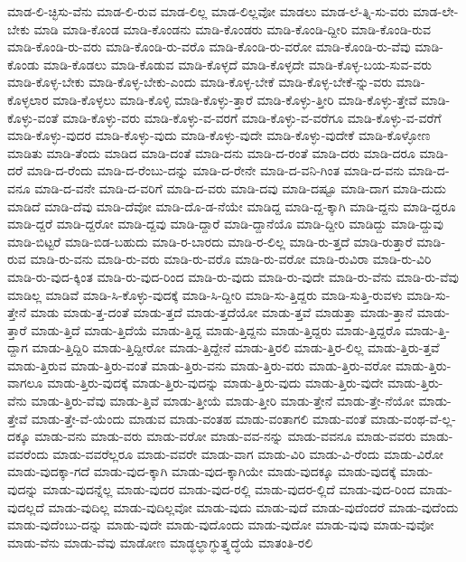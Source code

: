 {ಮಾಡ-ಲಿ-ಚ್ಛಿಸು-ವೆನು
ಮಾಡ-ಲಿ-ರುವ
ಮಾಡ-ಲಿಲ್ಲ
ಮಾಡ-ಲಿಲ್ಲವೋ
ಮಾಡಲು
ಮಾಡ-ಲೆ-ತ್ನಿ-ಸು-ವರು
ಮಾಡ-ಲೇ-ಬೇಕು
ಮಾಡಿ
ಮಾಡಿ-ಕೊಂಡ
ಮಾಡಿ-ಕೊಂಡನು
ಮಾಡಿ-ಕೊಂಡರು
ಮಾಡಿ-ಕೊಂಡಿ-ದ್ದೀರಿ
ಮಾಡಿ-ಕೊಂಡಿ-ರುವ
ಮಾಡಿ-ಕೊಂಡಿ-ರು-ವರು
ಮಾಡಿ-ಕೊಂಡಿ-ರು-ವರೊ
ಮಾಡಿ-ಕೊಂಡಿ-ರು-ವರೋ
ಮಾಡಿ-ಕೊಂಡಿ-ರು-ವೆವು
ಮಾಡಿ-ಕೊಂಡು
ಮಾಡಿ-ಕೊಡಲು
ಮಾಡಿ-ಕೊಡುವ
ಮಾಡಿ-ಕೊಳ್ಳದೆ
ಮಾಡಿ-ಕೊಳ್ಳದೇ
ಮಾಡಿ-ಕೊಳ್ಳ-ಬಯ-ಸುವ-ವರು
ಮಾಡಿ-ಕೊಳ್ಳ-ಬೇಕು
ಮಾಡಿ-ಕೊಳ್ಳ-ಬೇಕು-ಎಂದು
ಮಾಡಿ-ಕೊಳ್ಳ-ಬೇಕೆ
ಮಾಡಿ-ಕೊಳ್ಳ-ಬೇಕೆ-ನ್ನು-ವರು
ಮಾಡಿ-ಕೊಳ್ಳಲಾರ
ಮಾಡಿ-ಕೊಳ್ಳಲು
ಮಾಡಿ-ಕೊಳ್ಳಿ
ಮಾಡಿ-ಕೊಳ್ಳು-ತ್ತಾರೆ
ಮಾಡಿ-ಕೊಳ್ಳು-ತ್ತೀರಿ
ಮಾಡಿ-ಕೊಳ್ಳು-ತ್ತೇವೆ
ಮಾಡಿ-ಕೊಳ್ಳು-ವಂತೆ
ಮಾಡಿ-ಕೊಳ್ಳು-ವರು
ಮಾಡಿ-ಕೊಳ್ಳು-ವ-ವರಗೆ
ಮಾಡಿ-ಕೊಳ್ಳು-ವ-ವರೆಗೂ
ಮಾಡಿ-ಕೊಳ್ಳು-ವ-ವರೆಗೆ
ಮಾಡಿ-ಕೊಳ್ಳು-ವುದರ
ಮಾಡಿ-ಕೊಳ್ಳು-ವುದು
ಮಾಡಿ-ಕೊಳ್ಳು-ವುದೇ
ಮಾಡಿ-ಕೊಳ್ಳು-ವುದೇಕೆ
ಮಾಡಿ-ಕೊಳ್ಳೋಣ
ಮಾಡಿತು
ಮಾಡಿ-ತೆಂದು
ಮಾಡಿದ
ಮಾಡಿ-ದಂತೆ
ಮಾಡಿ-ದನು
ಮಾಡಿ-ದ-ರಂತೆ
ಮಾಡಿ-ದರು
ಮಾಡಿ-ದರೂ
ಮಾಡಿ-ದರೆ
ಮಾಡಿ-ದ-ರೆಂದು
ಮಾಡಿ-ದ-ರೆಂಬು-ದನ್ನು
ಮಾಡಿ-ದ-ರೇನೇ
ಮಾಡಿ-ದ-ವನಿ-ಗಿಂತ
ಮಾಡಿ-ದ-ವನು
ಮಾಡಿ-ದ-ವನೂ
ಮಾಡಿ-ದ-ವನೇ
ಮಾಡಿ-ದ-ವರಿಗೆ
ಮಾಡಿ-ದ-ವರು
ಮಾಡಿ-ದವು
ಮಾಡಿ-ದಷ್ಟೂ
ಮಾಡಿ-ದಾಗ
ಮಾಡಿ-ದುದು
ಮಾಡಿದೆ
ಮಾಡಿ-ದೆವು
ಮಾಡಿ-ದೆವೋ
ಮಾಡಿ-ದೊ-ಡ-ನೆಯೇ
ಮಾಡಿದ್ದ
ಮಾಡಿ-ದ್ದ-ಕ್ಕಾಗಿ
ಮಾಡಿ-ದ್ದನು
ಮಾಡಿ-ದ್ದರೂ
ಮಾಡಿ-ದ್ದರೆ
ಮಾಡಿ-ದ್ದರೋ
ಮಾಡಿ-ದ್ದವು
ಮಾಡಿ-ದ್ದಾರೆ
ಮಾಡಿ-ದ್ದಾನೆಯೊ
ಮಾಡಿ-ದ್ದೀರಿ
ಮಾಡಿದ್ದು
ಮಾಡಿ-ದ್ದುವು
ಮಾಡಿ-ಬಿಟ್ಟರೆ
ಮಾಡಿ-ಬಿಡ-ಬಹುದು
ಮಾಡಿ-ರ-ಬಾರದು
ಮಾಡಿ-ರ-ಲಿಲ್ಲ
ಮಾಡಿ-ರು-ತ್ತದೆ
ಮಾಡಿ-ರುತ್ತಾರೆ
ಮಾಡಿ-ರುವ
ಮಾಡಿ-ರು-ವನು
ಮಾಡಿ-ರು-ವರು
ಮಾಡಿ-ರು-ವರೊ
ಮಾಡಿ-ರು-ವರೋ
ಮಾಡಿ-ರುವಿರಾ
ಮಾಡಿ-ರು-ವಿರಿ
ಮಾಡಿ-ರು-ವುದ-ಕ್ಕಿಂತ
ಮಾಡಿ-ರು-ವುದ-ರಿಂದ
ಮಾಡಿ-ರು-ವುದು
ಮಾಡಿ-ರು-ವುದೇ
ಮಾಡಿ-ರು-ವೆನು
ಮಾಡಿ-ರು-ವೆವು
ಮಾಡಿಲ್ಲ
ಮಾಡಿವೆ
ಮಾಡಿ-ಸಿ-ಕೊಳ್ಳು-ವುದಕ್ಕೆ
ಮಾಡಿ-ಸಿ-ದ್ದೀರಿ
ಮಾಡಿ-ಸು-ತ್ತಿದ್ದರು
ಮಾಡಿ-ಸುತ್ತಿ-ರುವಳು
ಮಾಡಿ-ಸು-ತ್ತೇನೆ
ಮಾಡು
ಮಾಡು-ತ್ತ-ದಂತೆ
ಮಾಡು-ತ್ತದೆ
ಮಾಡು-ತ್ತದೆಯೋ
ಮಾಡು-ತ್ತವೆ
ಮಾಡುತ್ತಾ
ಮಾಡು-ತ್ತಾನೆ
ಮಾಡು-ತ್ತಾರೆ
ಮಾಡು-ತ್ತಿದೆ
ಮಾಡು-ತ್ತಿದೆಯೆ
ಮಾಡು-ತ್ತಿದ್ದ
ಮಾಡು-ತ್ತಿದ್ದನು
ಮಾಡು-ತ್ತಿದ್ದರು
ಮಾಡು-ತ್ತಿದ್ದರೊ
ಮಾಡು-ತ್ತಿ-ದ್ದಾಗ
ಮಾಡು-ತ್ತಿದ್ದಿರಿ
ಮಾಡು-ತ್ತಿದ್ದೀರೋ
ಮಾಡು-ತ್ತಿದ್ದೇನೆ
ಮಾಡು-ತ್ತಿರಲಿ
ಮಾಡು-ತ್ತಿರ-ಲಿಲ್ಲ
ಮಾಡು-ತ್ತಿರು-ತ್ತವೆ
ಮಾಡು-ತ್ತಿರುವ
ಮಾಡು-ತ್ತಿರು-ವಂತೆ
ಮಾಡು-ತ್ತಿರು-ವನು
ಮಾಡು-ತ್ತಿರು-ವರು
ಮಾಡು-ತ್ತಿರು-ವರೋ
ಮಾಡು-ತ್ತಿರು-ವಾಗಲೂ
ಮಾಡು-ತ್ತಿರು-ವುದಕ್ಕೆ
ಮಾಡು-ತ್ತಿರು-ವುದನ್ನು
ಮಾಡು-ತ್ತಿರು-ವುದು
ಮಾಡು-ತ್ತಿರು-ವುದೇ
ಮಾಡು-ತ್ತಿರು-ವೆನು
ಮಾಡು-ತ್ತಿರು-ವೆವು
ಮಾಡು-ತ್ತಿವೆ
ಮಾಡು-ತ್ತೀಯೆ
ಮಾಡು-ತ್ತೀರಿ
ಮಾಡು-ತ್ತೇನೆ
ಮಾಡು-ತ್ತೇ-ನೆಯೋ
ಮಾಡು-ತ್ತೇವೆ
ಮಾಡು-ತ್ತೇ-ವೆ-ಯೆಂದು
ಮಾಡುವ
ಮಾಡು-ವಂತಹ
ಮಾಡು-ವಂತಾಗಲಿ
ಮಾಡು-ವಂತೆ
ಮಾಡು-ವಂಥ-ವೆ-ಲ್ಲ-ದಕ್ಕೂ
ಮಾಡು-ವನು
ಮಾಡು-ವರು
ಮಾಡು-ವರೋ
ಮಾಡು-ವವ-ನನ್ನು
ಮಾಡು-ವವನೂ
ಮಾಡು-ವವರು
ಮಾಡು-ವವರೆಂದು
ಮಾಡು-ವವರೆಲ್ಲರೂ
ಮಾಡು-ವವರೇ
ಮಾಡು-ವಾಗ
ಮಾಡು-ವಿರಿ
ಮಾಡು-ವಿ-ರೆಂದು
ಮಾಡು-ವಿರೋ
ಮಾಡು-ವುದಕ್ಕಾ-ಗದೆ
ಮಾಡು-ವುದ-ಕ್ಕಾಗಿ
ಮಾಡು-ವುದ-ಕ್ಕಾಗಿಯೇ
ಮಾಡು-ವುದಕ್ಕೂ
ಮಾಡು-ವುದಕ್ಕೆ
ಮಾಡು-ವುದನ್ನು
ಮಾಡು-ವುದನ್ನೆಲ್ಲ
ಮಾಡು-ವುದರ
ಮಾಡು-ವುದ-ರಲ್ಲಿ
ಮಾಡು-ವುದರ-ಲ್ಲಿದೆ
ಮಾಡು-ವುದ-ರಿಂದ
ಮಾಡು-ವುದಲ್ಲದೆ
ಮಾಡು-ವುದಿಲ್ಲ
ಮಾಡು-ವುದಿಲ್ಲವೋ
ಮಾಡು-ವುದು
ಮಾಡು-ವುದೆ
ಮಾಡು-ವುದೆಂದರೆ
ಮಾಡು-ವುದೆಂದು
ಮಾಡು-ವುದೆಂಬು-ದನ್ನು
ಮಾಡು-ವುದೇ
ಮಾಡು-ವುದೊಂದು
ಮಾಡು-ವುದೋ
ಮಾಡು-ವುವು
ಮಾಡು-ವುವೋ
ಮಾಡು-ವೆನು
ಮಾಡು-ವೆವು
ಮಾಡೋಣ
ಮಾಡ್ಧಲ್ಧಾಗ್ಧುತ್ತ್ಧದ್ಧೆಯೆ
ಮಾತಂತಿ-ರಲಿ
}
